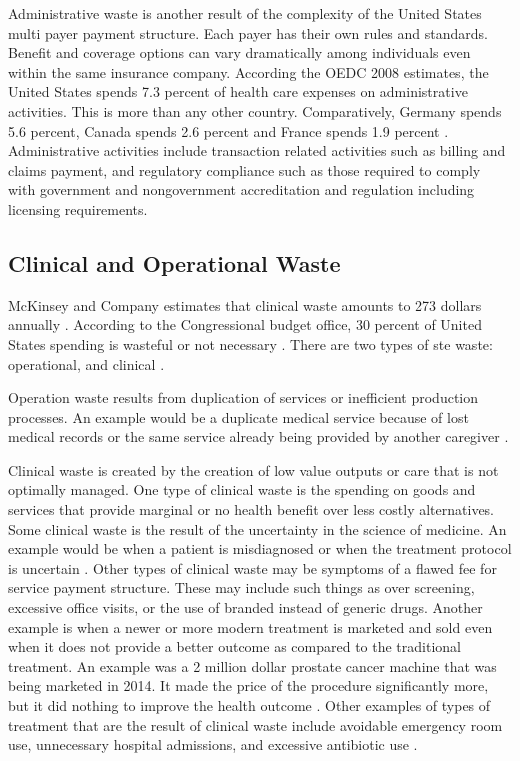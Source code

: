 \documentclass[sigconf]{acmart}
\begin{document}
Administrative waste is another result of the complexity of the United States multi payer payment structure. Each payer has their own rules and standards. Benefit and coverage options can vary dramatically among individuals even within the same insurance company.  According the OEDC 2008 estimates, the United States spends 7.3 percent of health care expenses on administrative activities. This is more than any other country. Comparatively, Germany spends 5.6 percent, Canada spends 2.6 percent and France spends 1.9 percent \cite{OEDC}.  Administrative activities include transaction related activities such as billing and claims payment, and regulatory compliance such as those required to comply with government and nongovernment accreditation and regulation including licensing requirements.

\subsection{Clinical and Operational Waste}

McKinsey and Company estimates that clinical waste amounts to 273 dollars annually \cite{springer}. According to the Congressional budget office, 30 percent of United States spending is wasteful or not necessary \cite{www-google-consumer}. There are two types of ste  waste: operational, and clinical \cite{milbank}.


Operation waste results from duplication of services or inefficient production processes.  An example would be a duplicate medical service because of lost medical records or the same service already being provided by another caregiver \cite{milbank}.


Clinical waste is created by the creation of low value outputs or care that is not optimally managed. One type of clinical waste is the spending on goods and services that provide marginal or no health benefit over less costly alternatives.  Some clinical waste is the result of the uncertainty in the science of medicine. An example would be when a patient is misdiagnosed or when the treatment protocol is uncertain \cite{milbank}. Other types of clinical waste may be symptoms of a flawed fee for service payment structure. These may include such things as over screening, excessive office visits, or the use of branded instead of generic drugs.  Another example is when a newer or more modern treatment is marketed and sold even when it does not provide a better outcome as compared to the traditional treatment. An example was a 2 million dollar prostate cancer machine that was being marketed in 2014. It made the price of the procedure significantly more, but it did nothing to improve the health outcome \cite{www-google-consumer}.  Other examples of types of treatment that are the result of clinical waste include avoidable emergency room use, unnecessary hospital admissions, and excessive antibiotic use \cite{milbank}. 
 
\end{document}
